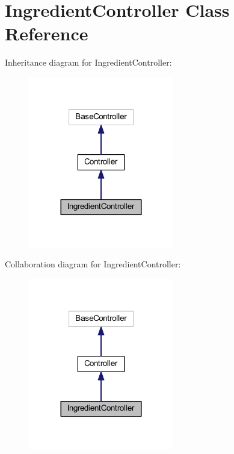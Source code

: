 \hypertarget{class_app_1_1_http_1_1_controllers_1_1_product_1_1_ingredient_controller}{}\section{Ingredient\+Controller Class Reference}
\label{class_app_1_1_http_1_1_controllers_1_1_product_1_1_ingredient_controller}


Inheritance diagram for Ingredient\+Controller\+:
\nopagebreak
\begin{figure}[H]
\begin{center}
\leavevmode
\includegraphics[width=180pt]{class_app_1_1_http_1_1_controllers_1_1_product_1_1_ingredient_controller__inherit__graph}
\end{center}
\end{figure}


Collaboration diagram for Ingredient\+Controller\+:
\nopagebreak
\begin{figure}[H]
\begin{center}
\leavevmode
\includegraphics[width=180pt]{class_app_1_1_http_1_1_controllers_1_1_product_1_1_ingredient_controller__coll__graph}
\end{center}
\end{figure}
